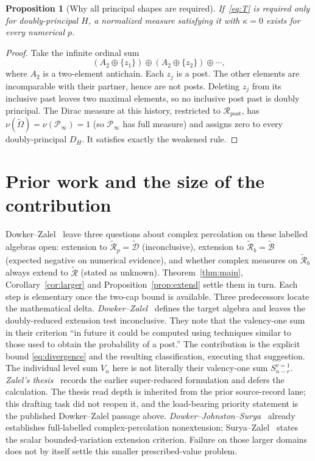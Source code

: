 \documentclass[11pt]{article}
\newtheorem{proposition}[theorem]{Proposition}
\theoremstyle{definition}
\newcommand{\Om}{\widetilde\Omega}
\newcommand{\D}{\widetilde{\mathcal D}}
\newcommand{\Rp}{\mathcal R_{\mathrm{post}}}
\newcommand{\Bt}{\widetilde{\mathcal B}}
\newcommand{\Pinfty}{\mathcal P_\infty}
\begin{document}
\begin{proposition}[Why all principal shapes are required]\label{prop:dirac}
If~\eqref{eq:T} is required only for doubly-principal $H$, a normalized
measure satisfying it with $\kappa=0$ exists for every numerical $p$.
\end{proposition}
\begin{proof}
Take the infinite ordinal sum
\begin{equation}\label{eq:dirac}
 (A_2\oplus\{z_1\})\oplus(A_2\oplus\{z_2\})\oplus\cdots,
\end{equation}
where $A_2$ is a two-element antichain. Each $z_j$ is a post. The other
elements are incomparable with their partner, hence are not posts.
Deleting $z_j$ from its inclusive past leaves two maximal elements, so no
inclusive post past is doubly principal. The Dirac measure at this history,
restricted to $\Rp$, has $\nu(\Om)=\nu(\Pinfty)=1$ (so $\Pinfty$ has full measure) and assigns zero to every
doubly-principal $D_H$. It satisfies exactly the weakened rule.
\end{proof}

\section{Prior work and the size of the contribution}
Dowker--Zalel~\cite[Secs.~III.4 and V]{DZ} leave three questions about
complex percolation on these labelled algebras open: extension to
$\widetilde{\mathcal R}_p=\D$ (inconclusive), extension to
$\widetilde{\mathcal R}_b=\Bt$ (expected negative on numerical evidence), and
whether complex measures on $\widetilde{\mathcal R}_b$ always extend to
$\widetilde{\mathcal R}$ (stated as unknown). Theorem~\ref{thm:main},
Corollary~\ref{cor:larger} and Proposition~\ref{prop:extend} settle them in
turn. Each step is elementary once the two-cap bound is available.
Three predecessors locate the mathematical delta.
\emph{Dowker--Zalel}~\cite[Sec.~V, Eqs.~(29)--(31)]{DZ} defines the target
algebra and leaves the doubly-reduced extension test inconclusive. They note that the valency-one sum in their criterion
``in future it could be computed using techniques similar to those used to
obtain the probability of a post.'' The contribution is the explicit bound
\eqref{eq:divergence} and the resulting classification, executing that
suggestion. The individual level sum $V_n$ here is not literally their valency-one sum
$S_{n-r}^{v=1}$.
\emph{Zalel's thesis}~\cite[Ch.~6, Sec.~6.2.3, pp.~89--90]{Zalel}
records the earlier super-reduced formulation and defers the calculation.
The thesis read depth is inherited from the prior source-record lane; this
drafting task did not reopen it, and the load-bearing priority statement is
the published Dowker--Zalel passage above.
\emph{Dowker--Johnston--Surya}~\cite[Sec.~4]{DJS} already establishes
full-labelled complex-percolation nonextension; Surya--Zalel~\cite[Theorem~2.1]{SZ}
states the scalar bounded-variation extension criterion. Failure on those
larger domains does not by itself settle this smaller prescribed-value problem.
\end{document}

